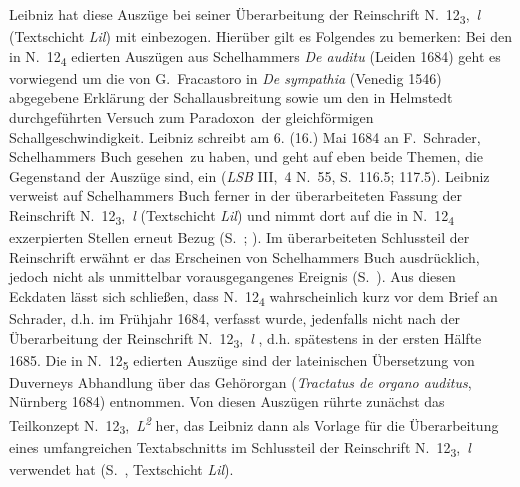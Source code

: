 Leibniz hat diese Auszüge bei seiner Überarbeitung der Reinschrift N.~12\textsubscript{3},~\textit{l} (Textschicht \textit{Lil}) mit einbezogen.
Hierüber gilt es Folgendes zu bemerken:
\pend
\pstart%
Bei den in N.~12\textsubscript{4} edierten Auszügen aus Schelhammers \textit{De auditu}\cite{01204} (Leiden 1684) geht es vor\-wie\-gend um die von G.~Fracastoro\protect{} in \textit{De sympathia}\cite{01215} (Venedig 1546) abgegebene Erklärung der Schall\-aus\-brei\-tung sowie um den in Helmstedt durchgeführten Versuch zum \glqq Paradoxon\grqq\ der gleich\-förmigen Schall\-ge\-schwin\-dig\-keit.
Leibniz schreibt am 6. (16.) Mai 1684 an F.~Schrader,\protect{} Schelhammers Buch \glqq gesehen\grqq\ zu haben, und geht auf eben beide Themen, die Gegenstand der Auszüge sind, ein (\textit{LSB} III,~4 N.~55,\cite{01224} S.~116.5; 117.5).
Leibniz verweist auf Schel\-hammers Buch ferner in der überarbeiteten Fassung der Reinschrift N.~12\textsubscript{3},~\textit{l} (Textschicht \textit{Lil}) und nimmt dort auf die in N.~12\textsubscript{4} exzerpierten Stellen erneut Bezug (S.~; ).
Im überarbeiteten Schlussteil der Reinschrift %
erwähnt er das Erscheinen von Schelhammers Buch ausdrücklich, jedoch nicht als unmittelbar vorausgegangenes Ereignis (S.~).
Aus diesen Eckdaten lässt sich schließen, dass N.~12\textsubscript{4} %
wahrscheinlich kurz vor dem Brief an Schrader, d.h. im Frühjahr 1684, verfasst wurde, jedenfalls nicht nach der Überarbeitung der Reinschrift N.~12\textsubscript{3},~\textit{l}%
, d.h. spätestens in der ersten Hälfte 1685. %
\pend
\pstart%
Die in N.~12\textsubscript{5} edierten Auszüge sind der lateinischen Übersetzung von Duverneys\protect{} Abhandlung über das Gehörorgan (\cite{01203}\textit{Tractatus de organo auditus}, Nürnberg 1684) entnommen.
Von diesen Auszügen rührte zunächst das Teilkonzept N.~12\textsubscript{3},~\textit{L\textsuperscript{2}} her, das Leibniz dann als Vorlage für die Überarbeitung eines umfangreichen Textabschnitts im Schlussteil der Reinschrift N.~12\textsubscript{3},~\textit{l} verwendet hat (S.~, Textschicht \textit{Lil}).
